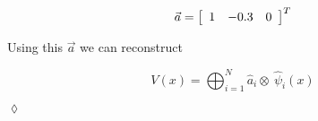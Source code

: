 \begin{example}
\begin{equation*}
\vec{a} = \left[\begin{array}{c c c} 1 & -0.3 & 0 \end{array}\right]^T
\end{equation*}

Using this $\vec{a}$ we can reconstruct

\begin{equation*}
V (x) = \bigoplus_{i=1}^N\hat{a}_i\otimes~\hat{\psi}_i (x)
\end{equation*}

$\lozenge$
\end{example}%
